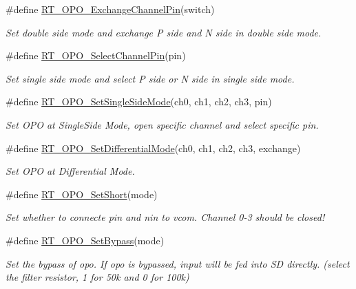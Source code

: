 \begin{DoxyCompactItemize}
\#define \mbox{\hyperlink{a00002_a1846f829df60ca42a455a1688eee7310}{R\+T\+\_\+\+O\+P\+O\+\_\+\+Exchange\+Channel\+Pin}}(switch)
\begin{DoxyCompactList}\small\item\em Set double side mode and exchange P side and N side in double side mode. \end{DoxyCompactList}\item 
\#define \mbox{\hyperlink{a00002_aaa7081959e37104e40e3f637d42d5144}{R\+T\+\_\+\+O\+P\+O\+\_\+\+Select\+Channel\+Pin}}(pin)
\begin{DoxyCompactList}\small\item\em Set single side mode and select P side or N side in single side mode. \end{DoxyCompactList}\item 
\#define \mbox{\hyperlink{a00002_a6438defc0d6280f2b5baedc039f2e314}{R\+T\+\_\+\+O\+P\+O\+\_\+\+Set\+Single\+Side\+Mode}}(ch0,  ch1,  ch2,  ch3,  pin)
\begin{DoxyCompactList}\small\item\em Set O\+PO at Single\+Side Mode, open specific channel and select specific pin. \end{DoxyCompactList}\item 
\#define \mbox{\hyperlink{a00002_aadbc9c89735814445f0dc8d4b4eb3e54}{R\+T\+\_\+\+O\+P\+O\+\_\+\+Set\+Differential\+Mode}}(ch0,  ch1,  ch2,  ch3,  exchange)
\begin{DoxyCompactList}\small\item\em Set O\+PO at Differential Mode. \end{DoxyCompactList}\item 
\#define \mbox{\hyperlink{a00002_aef61e41bd9fb19c3690ff5a25fb9893d}{R\+T\+\_\+\+O\+P\+O\+\_\+\+Set\+Short}}(mode)
\begin{DoxyCompactList}\small\item\em Set whether to connecte pin and nin to vcom. Channel 0-\/3 should be closed! \end{DoxyCompactList}\item 
\#define \mbox{\hyperlink{a00002_a3297280ab870eae12b918351e111819a}{R\+T\+\_\+\+O\+P\+O\+\_\+\+Set\+Bypass}}(mode)
\begin{DoxyCompactList}\small\item\em Set the bypass of opo. If opo is bypassed, input will be fed into SD directly. (select the filter resistor, 1 for 50k and 0 for 100k) \end{DoxyCompactList}\item 

\end{DoxyCompactItemize}
